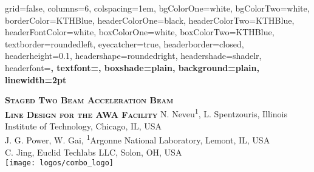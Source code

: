 \documentclass[portrait,final,paperwidth=92cm, paperheight=152cm,  fontscale=0.277]{baposter}
\begin{document}



\begin{poster}{
	grid=false,
	columns=6,
	colspacing=1em,
	bgColorOne=white,
	bgColorTwo=white,
	borderColor=KTHBlue,
	headerColorOne=black,
	headerColorTwo=KTHBlue,
	headerFontColor=white,
	boxColorOne=white,
	boxColorTwo=KTHBlue,
	textborder=roundedleft,
	eyecatcher=true,
	headerborder=closed,
	headerheight=0.1\textheight,
	headershape=roundedright,
	headershade=shadelr,
	headerfont=\Large\bf\textsc, %
	textfont={\setlength{\parindent}{0em}},
	boxshade=plain,
	background=plain,
	linewidth=2pt
}
{
	
		
} %
{\bf\textsc{Staged Two Beam Acceleration Beam\\
		\vspace{0.3em} Line Design for the AWA Facility}}%
{\vspace{1em}
	N. Neveu\textsuperscript{1}, L. Spentzouris, Illinois Institute of Technology, Chicago, IL, USA \\
	J. G. Power, W. Gai, \textsuperscript{1}Argonne National  Laboratory, Lemont, IL, USA \\
	C. Jing, Euclid Techlabs LLC, Solon, OH, USA \\
    }
{%
		\texttt{[image: logos/combo\_logo]}%
}






\end{poster}
\end{document}
